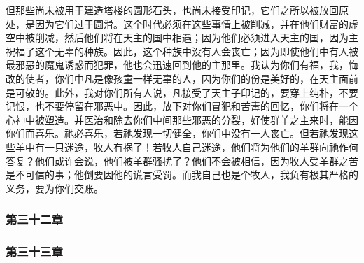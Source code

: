 但那些尚未被用于建造塔楼的圆形石头，也尚未接受印记，它们之所以被放回原处，是因为它们过于圆滑。这个时代必须在这些事情上被削减，并在他们财富的虚空中被削减，然后他们将在天主的国中相遇；因为他们必须进入天主的国，因为主祝福了这个无辜的种族。因此，这个种族中没有人会丧亡；因为即使他们中有人被最邪恶的魔鬼诱惑而犯罪，他也会迅速回到他的主那里。我认为你们有福，我，悔改的使者，你们中凡是像孩童一样无辜的人，因为你们的份是美好的，在天主面前是可敬的。此外，我对你们所有人说，凡接受了天主子印记的，要穿上纯朴，不要记恨，也不要停留在邪恶中。因此，放下对你们冒犯和苦毒的回忆，你们将在一个心神中被塑造。并医治和除去你们中间那些邪恶的分裂，好使群羊之主来时，能因你们而喜乐。祂必喜乐，若祂发现一切健全，你们中没有一人丧亡。但若祂发现这些羊中有一只迷途，牧人有祸了！若牧人自己迷途，他们将为他们的羊群向祂作何答复？他们或许会说，他们被羊群骚扰了？他们不会被相信，因为牧人受羊群之苦是不可信的事；他倒要因他的谎言受罚。而我自己也是个牧人，我负有极其严格的义务，要为你们交账。\par


\subsubsection{第三十二章}

\par


\subsubsection{第三十三章}

